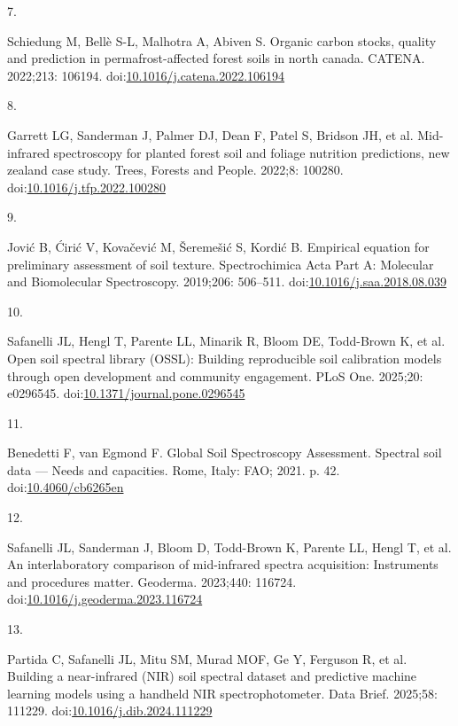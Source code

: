 \documentclass[
  letterpaper,
  DIV=11,
  numbers=noendperiod]{scrreprt}
\newlength{\cslhangindent}
\newlength{\csllabelwidth}
\newenvironment{CSLReferences}[2] %
 {\begin{list}{}{%
  \setlength{\itemindent}{0pt}
  \setlength{\leftmargin}{0pt}
  \setlength{\parsep}{0pt}
  \ifodd #1
   \setlength{\leftmargin}{\cslhangindent}
   \setlength{\itemindent}{-1\cslhangindent}
  \fi
  \setlength{\itemsep}{#2\baselineskip}}}
 {\end{list}}
\newcommand{\CSLLeftMargin}[1]{\parbox[t]{\csllabelwidth}{\strut#1\strut}}
\newcommand{\CSLRightInline}[1]{\parbox[t]{\linewidth - \csllabelwidth}{\strut#1\strut}}
\begin{document}
\begin{CSLReferences}{0}{1}
\CSLLeftMargin{7. }%
\CSLRightInline{Schiedung M, Bellè S-L, Malhotra A, Abiven S. Organic
carbon stocks, quality and prediction in permafrost-affected forest
soils in north canada. {CATENA}. 2022;213: 106194.
doi:\href{https://doi.org/10.1016/j.catena.2022.106194}{10.1016/j.catena.2022.106194}}

\CSLLeftMargin{8. }%
\CSLRightInline{Garrett LG, Sanderman J, Palmer DJ, Dean F, Patel S,
Bridson JH, et al. Mid-infrared spectroscopy for planted forest soil and
foliage nutrition predictions, new zealand case study. Trees, Forests
and People. 2022;8: 100280.
doi:\href{https://doi.org/10.1016/j.tfp.2022.100280}{10.1016/j.tfp.2022.100280}}

\CSLLeftMargin{9. }%
\CSLRightInline{Jović B, Ćirić V, Kovačević M, Šeremešić S, Kordić B.
Empirical equation for preliminary assessment of soil texture.
Spectrochimica Acta Part A: Molecular and Biomolecular Spectroscopy.
2019;206: 506--511.
doi:\href{https://doi.org/10.1016/j.saa.2018.08.039}{10.1016/j.saa.2018.08.039}}

\CSLLeftMargin{10. }%
\CSLRightInline{Safanelli JL, Hengl T, Parente LL, Minarik R, Bloom DE,
Todd-Brown K, et al. Open soil spectral library ({OSSL)}: Building
reproducible soil calibration models through open development and
community engagement. PLoS One. 2025;20: e0296545.
doi:\href{https://doi.org/10.1371/journal.pone.0296545}{10.1371/journal.pone.0296545}}

\CSLLeftMargin{11. }%
\CSLRightInline{Benedetti F, van Egmond F. {Global Soil Spectroscopy
Assessment. Spectral soil data --- Needs and capacities}. Rome, Italy:
FAO; 2021. p. 42.
doi:\href{https://doi.org/10.4060/cb6265en}{10.4060/cb6265en}}

\CSLLeftMargin{12. }%
\CSLRightInline{Safanelli JL, Sanderman J, Bloom D, Todd-Brown K,
Parente LL, Hengl T, et al. An interlaboratory comparison of
mid-infrared spectra acquisition: Instruments and procedures matter.
Geoderma. 2023;440: 116724.
doi:\href{https://doi.org/10.1016/j.geoderma.2023.116724}{10.1016/j.geoderma.2023.116724}}

\CSLLeftMargin{13. }%
\CSLRightInline{Partida C, Safanelli JL, Mitu SM, Murad MOF, Ge Y,
Ferguson R, et al. Building a near-infrared ({NIR}) soil spectral
dataset and predictive machine learning models using a handheld {NIR}
spectrophotometer. Data Brief. 2025;58: 111229.
doi:\href{https://doi.org/10.1016/j.dib.2024.111229}{10.1016/j.dib.2024.111229}}


\end{CSLReferences}
\end{document}
